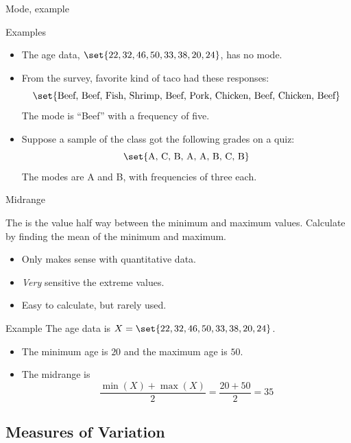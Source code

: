 \documentclass[xcolor=table, handout]{beamer}
\begin{document}
\begin{frame}{Mode, example} 
\begin{exampleblock}{Examples}
\begin{itemize}
\item The age data, $ \set{22, 32, 46, 50, 33, 38, 20, 24}$, has no mode.
\pause
\item From the survey, favorite kind of taco had these responses:
\[\set{\text{Beef, Beef, Fish, Shrimp, Beef, Pork, Chicken, Beef, Chicken, Beef}}\]
The mode is ``Beef'' with a frequency of five.
\pause
\item Suppose a sample of the class got the following grades on a quiz:
\[\set{\text{A, C, B, A, A, B, C, B}}\]
The modes are A and B, with frequencies of three each.
\end{itemize}

\end{exampleblock}
\end{frame}

\begin{frame}{Midrange}
\begin{block}{}
The  is the value half way between the minimum and maximum values. Calculate by finding the mean of the minimum and maximum.
\begin{itemize}
\item Only makes sense with quantitative data.
\item \emph{Very} sensitive the extreme values.
\item Easy to calculate, but rarely used.
\end{itemize}
\end{block}

\pause
\begin{exampleblock}{Example}
The age data is $X = \set{22, 32, 46, 50, 33, 38, 20, 24}$.
\begin{itemize}
\item The minimum age is $20$ and the maximum age is $50$.
\item The midrange is 
\[\frac {\min(X) + \max(X)}{2} = \frac {20 + 50}{2} = 35\]
\end{itemize}
\smallskip
\end{exampleblock}

\end{frame}

\subsection{Measures of Variation}
\end{document}
